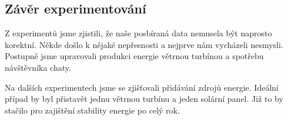 \subsection{Závěr experimentování}

Z experimentů jsme zjistili, že naše posbíraná data nemusela být naprosto korektní. Někde došlo k nějaké nepřesnosti a nejprve nám vycházeli nesmysli. Postupně jsme upravovali produkci energie větrnou turbínou a spotřebu návštěvníka chaty.

Na dalších experimentech jsme se zjišťovali přidávání zdrojů energie. Ideální případ by byl přistavět jednu větrnou turbínu a jeden solární panel. Již to by stačilo pro zajištění stability energie po celý rok.
